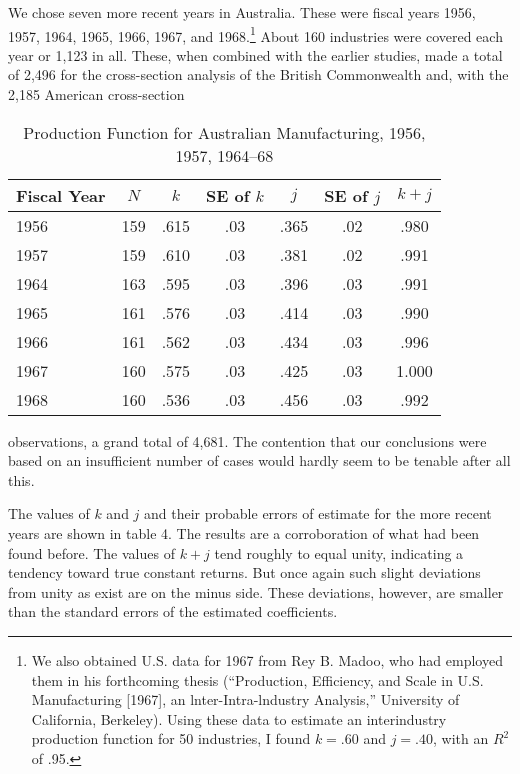 \documentclass{article}
\begin{document}
We chose seven more recent years in Australia. These were fiscal years 1956, 1957, 1964, 1965, 1966, 1967, and 1968.\footnote{We also obtained U.S. data for 1967 from Rey B. Madoo, who had employed them in his forthcoming thesis (``Production, Efficiency, and Scale in U.S. Manufacturing [1967], an lnter-Intra-lndustry Analysis,'' University of California, Berkeley). Using these data to estimate an interindustry production function for 50 industries, I found \(k = .60\) and \(j = .40\), with an \(R^2\) of .95.} About 160 industries were covered each year or 1,123 in all. These, when combined with the earlier studies, made a total of 2,496 for the cross-section analysis of the British Commonwealth and, with the 2,185 American cross-section %
\begin{table}[!t]
\centering
\footnotesize{
\caption{Production Function for Australian Manufacturing, 1956, 1957, 1964--68}%
\label{tab4}%
\begin{tabular}{lcccccc}
\hline
\hline
Fiscal Year & \(N\) & \(k\) & SE of \(k\) & \(j\) & SE of \(j\) & \(k + j\)\\
\hline
1956 & 159 & .615 & .03 & .365 & .02 & .980\\
1957 & 159 & .610 & .03 & .381 & .02 & .991\\
1964 & 163 & .595 & .03 & .396 & .03 & .991\\
1965 & 161 & .576 & .03 & .414 & .03 & .990\\
1966 & 161 & .562 & .03 & .434 & .03 & .996\\
1967 & 160 & .575 & .03 & .425 & .03 & 1.000\\
1968 & 160 & .536 & .03 & .456 & .03 & .992\\
\hline
\end{tabular}
}
\end{table}
observations, a grand total of 4,681. The contention that our conclusions were based on an insufficient number of cases would hardly seem to be tenable after all this.

The values of \(k\) and \(j\) and their probable errors of estimate for the more recent years are shown in table 4. The results are a corroboration of what had been found before. The values of \(k + j\) tend roughly to equal unity, indicating a tendency toward true constant returns. But once again such slight deviations from unity as exist are on the minus side. These deviations, however, are smaller than the standard errors of the estimated coefficients.
\end{document}
